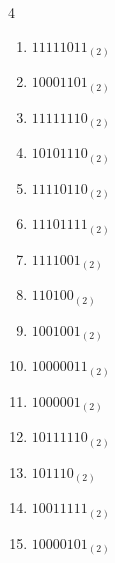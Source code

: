 \begin{multicols}{4}
\begin{enumerate}
        \phantom{$=117$}

  \item $11111011_{(2)}$

        \phantom{$=251$}

\columnbreak %

  \item $10001101_{(2)}$

        \phantom{$=141$}

  \item $11111110_{(2)}$

        \phantom{$=254$}

  \item $10101110_{(2)}$

        \phantom{$=174$}

  \item $11110110_{(2)}$

        \phantom{$=246$}

  \item $11101111_{(2)}$

        \phantom{$=239$}

  \item $1111001_{(2)}$

        \phantom{$=121$}

  \item $110100_{(2)}$

        \phantom{$=52$}

  \item $1001001_{(2)}$

        \phantom{$=73$}

  \item $10000011_{(2)}$

        \phantom{$=131$}

  \item $1000001_{(2)}$

        \phantom{$=65$}

  \item $10111110_{(2)}$

        \phantom{$=190$}

  \item $101110_{(2)}$

        \phantom{$=46$}

  \item $10011111_{(2)}$

        \phantom{$=159$}

  \item $10000101_{(2)}$


\end{enumerate}
\end{multicols}
